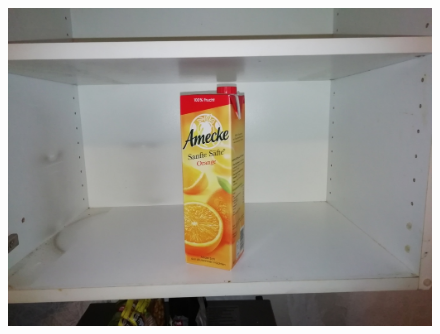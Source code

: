 \documentclass[a4paper,12pt,oneside]{article}
\begin{document}
\begin{figure}[htb]
\begin{minipage}[c]{0.3\textwidth}
\includegraphics[width=\textwidth]{Sources/image105.jpg}
\end{minipage}
\hfill
\begin{minipage}[c]{0.08\textwidth}

\end{minipage}
\end{figure}
\end{document}
